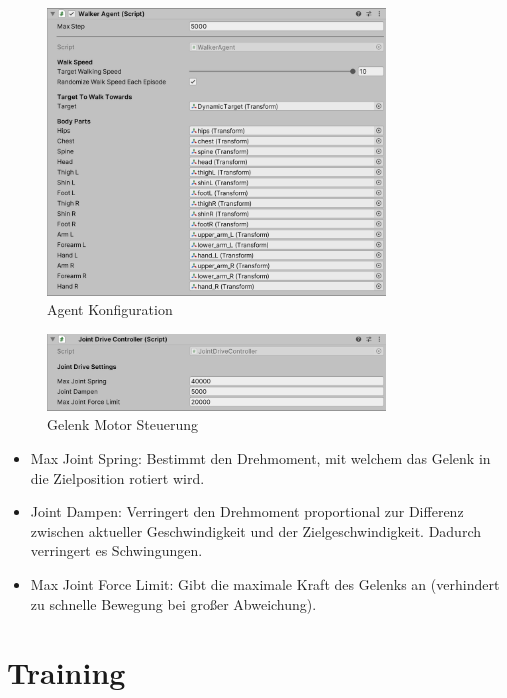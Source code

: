 \begin{figure}[H]
  \centering  
  \includegraphics[width=0.8\textwidth]{img/komponente_walker_agent}
  \caption{Agent Konfiguration}
  \label{fig:komponente_walker_agent}
\end{figure}

\begin{figure}[H]
  \centering  
  \includegraphics[width=0.8\textwidth]{img/komponente_joint_drive_controller}
  \caption{Gelenk Motor Steuerung}
  \label{fig:komponente_joint_drive_controller}
\end{figure}

\begin{itemize}
  \item Max Joint Spring: Bestimmt den Drehmoment, mit welchem das Gelenk in die Zielposition rotiert wird.
  \item Joint Dampen: Verringert den Drehmoment proportional zur Differenz zwischen aktueller Geschwindigkeit und der Zielgeschwindigkeit. Dadurch verringert es Schwingungen.
  \item Max Joint Force Limit: Gibt die maximale Kraft des Gelenks an (verhindert zu schnelle Bewegung bei großer Abweichung).
\end{itemize}

\section{Training}

